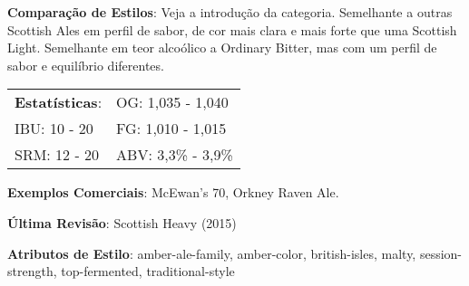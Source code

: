 \textbf{Comparação de Estilos}: Veja a introdução da categoria. Semelhante a outras Scottish Ales em perfil de sabor, de cor mais clara e mais forte que uma Scottish Light. Semelhante em teor alcoólico a Ordinary Bitter, mas com um perfil de sabor e equilíbrio diferentes.

\begin{tabular}{@{}p{35mm}p{35mm}@{}}
  \textbf{Estatísticas}: & OG: 1,035 - 1,040 \\
  IBU: 10 - 20 & FG: 1,010 - 1,015  \\
  SRM: 12 - 20  & ABV: 3,3\% - 3,9\%
\end{tabular}

\textbf{Exemplos Comerciais}: McEwan's 70, Orkney Raven Ale.

\textbf{Última Revisão}: Scottish Heavy (2015)

\textbf{Atributos de Estilo}: amber-ale-family, amber-color, british-isles, malty, session-strength, top-fermented, traditional-style
